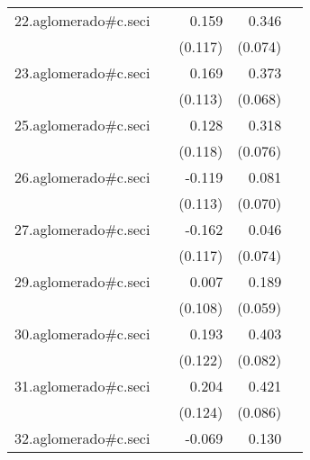 {\begin{longtable}{l*{4}{D{.}{.}{-1}}}
\addlinespace
22.aglomerado#c.seci&                     &       0.159         &       0.346\sym{***}&                     \\
            &                     &     (0.117)         &     (0.074)         &                     \\
\addlinespace
23.aglomerado#c.seci&                     &       0.169         &       0.373\sym{***}&                     \\
            &                     &     (0.113)         &     (0.068)         &                     \\
\addlinespace
25.aglomerado#c.seci&                     &       0.128         &       0.318\sym{***}&                     \\
            &                     &     (0.118)         &     (0.076)         &                     \\
\addlinespace
26.aglomerado#c.seci&                     &      -0.119         &       0.081         &                     \\
            &                     &     (0.113)         &     (0.070)         &                     \\
\addlinespace
27.aglomerado#c.seci&                     &      -0.162         &       0.046         &                     \\
            &                     &     (0.117)         &     (0.074)         &                     \\
\addlinespace
29.aglomerado#c.seci&                     &       0.007         &       0.189\sym{**} &                     \\
            &                     &     (0.108)         &     (0.059)         &                     \\
\addlinespace
30.aglomerado#c.seci&                     &       0.193         &       0.403\sym{***}&                     \\
            &                     &     (0.122)         &     (0.082)         &                     \\
\addlinespace
31.aglomerado#c.seci&                     &       0.204         &       0.421\sym{***}&                     \\
            &                     &     (0.124)         &     (0.086)         &                     \\
\addlinespace
32.aglomerado#c.seci&                     &      -0.069         &       0.130         &                     \\

\end{longtable}}

